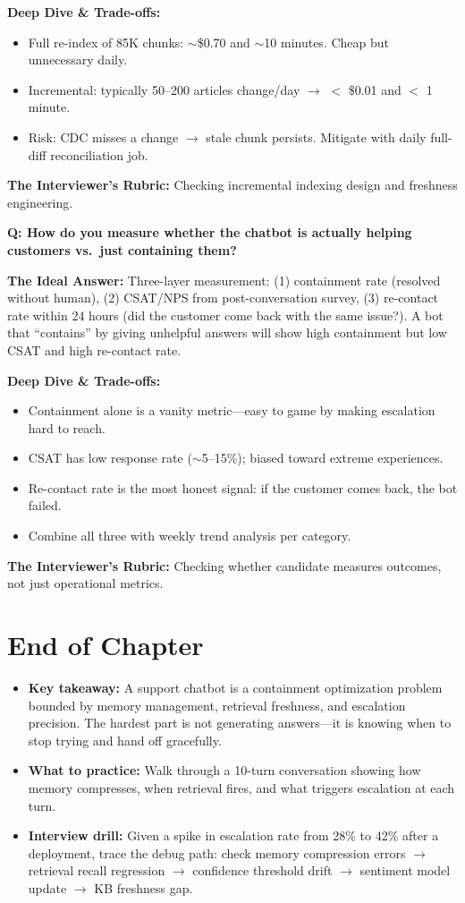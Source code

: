 \textbf{Deep Dive \& Trade-offs:}
\begin{itemize}
  \item Full re-index of 85K chunks: $\sim$\$0.70 and $\sim$10 minutes. Cheap but unnecessary daily.
  \item Incremental: typically 50--200 articles change/day $\rightarrow$ $<$ \$0.01 and $<$ 1 minute.
  \item Risk: CDC misses a change $\rightarrow$ stale chunk persists. Mitigate with daily full-diff reconciliation job.
\end{itemize}

\textbf{The Interviewer's Rubric:} Checking incremental indexing design and freshness engineering.

\textbf{Q: How do you measure whether the chatbot is actually helping customers vs.\ just containing them?}

\textbf{The Ideal Answer:} Three-layer measurement: (1) containment rate (resolved without human), (2) CSAT/NPS from post-conversation survey, (3) re-contact rate within 24 hours (did the customer come back with the same issue?). A bot that ``contains'' by giving unhelpful answers will show high containment but low CSAT and high re-contact rate.

\textbf{Deep Dive \& Trade-offs:}
\begin{itemize}
  \item Containment alone is a vanity metric---easy to game by making escalation hard to reach.
  \item CSAT has low response rate ($\sim$5--15\%); biased toward extreme experiences.
  \item Re-contact rate is the most honest signal: if the customer comes back, the bot failed.
  \item Combine all three with weekly trend analysis per category.
\end{itemize}

\textbf{The Interviewer's Rubric:} Checking whether candidate measures outcomes, not just operational metrics.

\section*{End of Chapter}

\begin{itemize}
  \item \textbf{Key takeaway:} A support chatbot is a containment optimization problem bounded by memory management, retrieval freshness, and escalation precision. The hardest part is not generating answers---it is knowing when to stop trying and hand off gracefully.
  \item \textbf{What to practice:} Walk through a 10-turn conversation showing how memory compresses, when retrieval fires, and what triggers escalation at each turn.
  \item \textbf{Interview drill:} Given a spike in escalation rate from 28\% to 42\% after a deployment, trace the debug path: check memory compression errors $\rightarrow$ retrieval recall regression $\rightarrow$ confidence threshold drift $\rightarrow$ sentiment model update $\rightarrow$ KB freshness gap.
\end{itemize}

